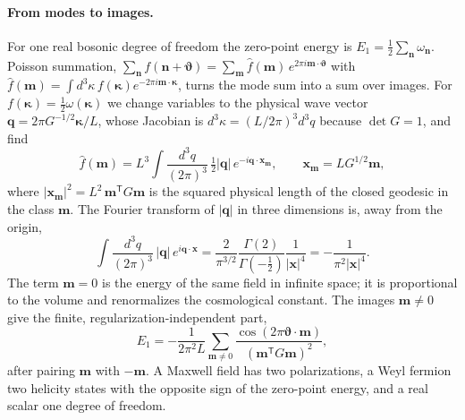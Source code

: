 \paragraph{From modes to images.}
For one real bosonic degree of freedom the zero-point energy is $E_1=\tfrac12\sum_{\bm n}\omega_{\bm n}$.
Poisson summation, $\sum_{\bm n}f(\bm n+\bm\vartheta)=\sum_{\bm m}\hat f(\bm m)\,e^{2\pi i\bm m\cdot\bm\vartheta}$ with $\hat f(\bm m)=\int d^3\kappa\,f(\bm\kappa)e^{-2\pi i\bm m\cdot\bm\kappa}$, turns the mode sum into a sum over images.
For $f(\bm\kappa)=\tfrac12\omega(\bm\kappa)$ we change variables to the physical wave vector $\bm q=2\pi G^{-1/2}\bm\kappa/L$, whose Jacobian is $d^3\kappa=(L/2\pi)^3d^3q$ because $\det G=1$, and find
\begin{equation}
\hat f(\bm m)=L^3\int\frac{d^3q}{(2\pi)^3}\,\tfrac12|\bm q|\,e^{-i\bm q\cdot\bm x_{\bm m}},\qquad \bm x_{\bm m}=LG^{1/2}\bm m ,
\end{equation}
where $|\bm x_{\bm m}|^2=L^2\,\bm m^{\mathsf T}G\bm m$ is the squared physical length of the closed geodesic in the class $\bm m$.
The Fourier transform of $|\bm q|$ in three dimensions is, away from the origin,
\begin{equation}
\int\frac{d^3q}{(2\pi)^3}\,|\bm q|\,e^{i\bm q\cdot\bm x}=\frac{2}{\pi^{3/2}}\frac{\Gamma(2)}{\Gamma(-\tfrac12)}\frac{1}{|\bm x|^4}=-\frac{1}{\pi^2|\bm x|^4}.
\end{equation}
The term $\bm m=0$ is the energy of the same field in infinite space; it is proportional to the volume and renormalizes the cosmological constant.
The images $\bm m\neq0$ give the finite, regularization-independent part,
\begin{equation}
E_1=-\frac{1}{2\pi^2L}\sum_{\bm m\neq0}\frac{\cos(2\pi\bm\vartheta\cdot\bm m)}{(\bm m^{\mathsf T}G\bm m)^2},
\label{eq:rA-E1}
\end{equation}
after pairing $\bm m$ with $-\bm m$.
A Maxwell field has two polarizations, a Weyl fermion two helicity states with the opposite sign of the zero-point energy, and a real scalar one degree of freedom.

